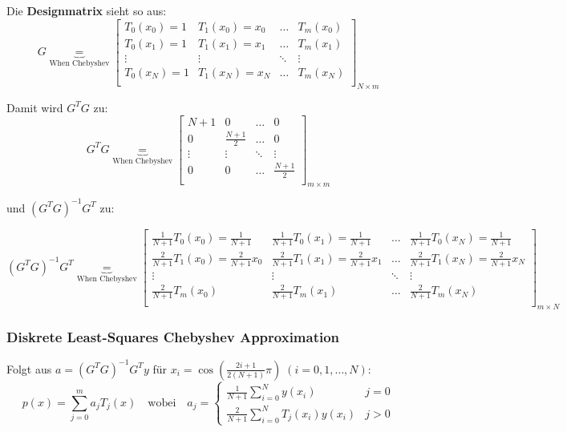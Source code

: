 \newpage

Die \textbf{Designmatrix} sieht so aus:
$$G \underbrace{=}_{\text{When Chebyshev}}
\begin{bmatrix}
  T_0(x_0) = 1 & T_1(x_0) = x_0 & \ldots & T_m(x_0) \\
  T_0(x_1) = 1 & T_1(x_1) = x_1 & \ldots & T_m(x_1)\\
  \vdots & \vdots  & \ddots & \vdots\\
  T_0(x_N) = 1 & T_1(x_N) =x_N & \ldots & T_m(x_N)\\
\end{bmatrix}_{N \times m}$$

Damit wird $G^T G$ zu:
$$G^T G \underbrace{=}_{\text{When Chebyshev}}
\begin{bmatrix}
  N+1 & 0 & \ldots & 0 \\
  0   & \frac{N+1}{2} & \ldots & 0\\
  \vdots  & \vdots & \ddots & \vdots\\
  0   & 0 & \ldots & \frac{N+1}{2}\\
\end{bmatrix}_{m \times m}$$

und $(G^T G)^{-1} G^T$ zu:

$$(G^T G)^{-1} G^T \underbrace{=}_{\text{When Chebyshev}}
\begin{bmatrix}
  \frac{1}{N+1} T_0(x_0) = \frac{1}{N+1} & \frac{1}{N+1} T_0(x_1) = \frac{1}{N+1} & \ldots & \frac{1}{N+1} T_0(x_N) = \frac{1}{N+1} \\
  \frac{2}{N+1} T_1(x_0) = \frac{2}{N+1} x_0 & \frac{2}{N+1} T_1(x_1) = \frac{2}{N+1} x_1 & \ldots & \frac{2}{N+1} T_1(x_N) = \frac{2}{N+1}x_N\\
  \vdots & \vdots  & \ddots & \vdots\\
  \frac{2}{N+1} T_m(x_0) & \frac{2}{N+1} T_m(x_1) & \ldots & \frac{2}{N+1} T_m(x_N)\\
\end{bmatrix}_{m \times N}$$

\subsubsection{Diskrete Least-Squares Chebyshev Approximation}
Folgt aus $a=(G^T G)^{-1} G^T y$ für $x_i=\cos(\frac{2i+1}{2(N+1)}\pi)\;(i=0,1,\ldots,N)$:
$$p(x) = \sum_{j=0}^m a_j T_j(x) \quad \text{wobei} \quad
a_j = \begin{cases}
  \frac{1}{N+1} \sum_{i=0}^N y(x_i) & j = 0\\
  \frac{2}{N+1} \sum_{i=0}^N T_j(x_i) y(x_i) & j > 0
\end{cases}$$

